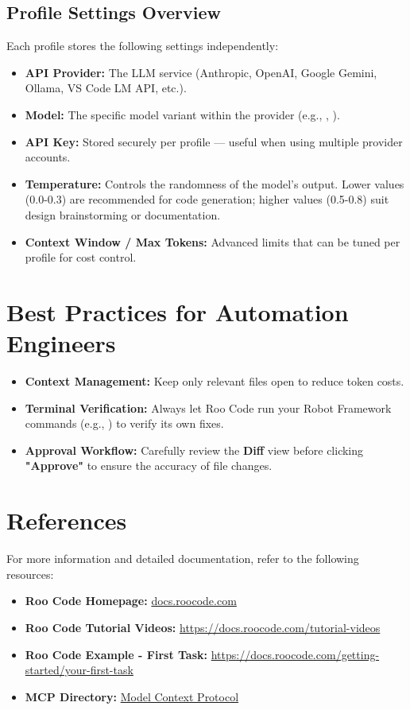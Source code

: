 \subsection{Profile Settings Overview}

Each profile stores the following settings independently:

\begin{itemize}
   \item \textbf{API Provider:} The LLM service (Anthropic, OpenAI, Google
      Gemini, Ollama, VS Code LM API, etc.).
   \item \textbf{Model:} The specific model variant within the provider
      (e.g., , ).
   \item \textbf{API Key:} Stored securely per profile — useful when using
      multiple provider accounts.
   \item \textbf{Temperature:} Controls the randomness of the model's output.
      Lower values (0.0-0.3) are recommended for code generation;
      higher values (0.5-0.8) suit design brainstorming or documentation.
   \item \textbf{Context Window / Max Tokens:} Advanced limits that can be
      tuned per profile for cost control.
\end{itemize}

\section{Best Practices for Automation Engineers}
\begin{itemize}
   \item \textbf{Context Management:}
      Keep only relevant files open to reduce token costs.
   \item \textbf{Terminal Verification:}
      Always let Roo Code run your Robot Framework commands
      (e.g., ) to verify its own fixes.
   \item \textbf{Approval Workflow:}
      Carefully review the \textbf{Diff} view before clicking \textbf{"Approve"}
      to ensure the accuracy of file changes.
\end{itemize}

\section{References}
For more information and detailed documentation,
refer to the following resources:
\begin{itemize}
   \item \textbf{Roo Code Homepage:}
      \href{https://docs.roocode.com/}{docs.roocode.com}
   \item \textbf{Roo Code Tutorial Videos:}
      \href{https://docs.roocode.com/tutorial-videos}
      {https://docs.roocode.com/tutorial-videos}
   \item \textbf{Roo Code Example - First Task:}
      \href{https://docs.roocode.com/getting-started/your-first-task}
      {https://docs.roocode.com/getting-started/your-first-task}
   \item \textbf{MCP Directory:}
      \href{https://modelcontextprotocol.io/}{Model Context Protocol}
\end{itemize}

